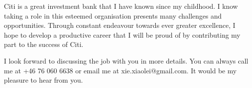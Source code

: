 \documentclass[10pt,a4paper, gentium]{moderncv}        %
\begin{document}
Citi is a great investment bank that I have known since my
childhood. I know taking a role in this esteemed organisation presents
many challenges and opportunities. Through constant endeavour towards
ever greater excellence, I hope to develop a productive career that I
will be proud of by contributing my part to the success of Citi.

I look forward to discussing the job with you in more
details. You can always call me at +46 76 060 6638 or email me at
xie.xiaolei@gmail.com. It would be my pleasure to hear from you.

\makeletterclosing
\end{document}
